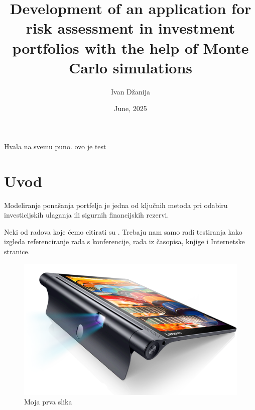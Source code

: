 \documentclass[zavrsnirad]{fer}
\title{Development of an application for risk assessment in investment portfolios with the help of Monte Carlo simulations}
\author{Ivan Džanija}
\date{June, 2025}
\begin{document}
\maketitle




\begin{zahvale}
  Hvala na svemu puno.
    ovo je test
\end{zahvale}

\mainmatter

\tableofcontents

\chapter{Uvod}
\label{pog:uvod}

Modeliranje ponašanja portfelja je jedna od ključnih metoda pri odabiru
investicijskih ulaganja ili sigurnih financijskih rezervi.

Neki od radova koje ćemo citirati su \cite{6248073,6247753,ghiglia_pritt_phase_unwrapping,hartley2003multiple,4250461,123DCatch}.
Trebaju nam samo radi testiranja kako izgleda referenciranje rada s konferencije, rada iz časopisa, knjige i Internetske stranice.

\begin{figure}[htb]
  \centering
  \includegraphics[width=0.38\linewidth]{Figures/lenovo_yoga_tab3_pro_front.png}
  \caption{Moja prva slika}
  \label{slk:prvaslika}
\end{figure}
\end{document}
